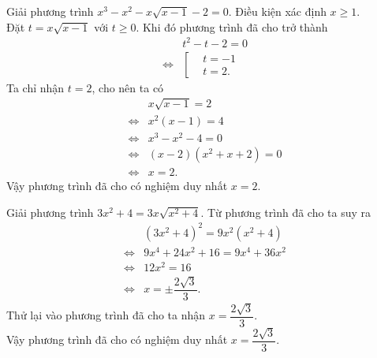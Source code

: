 \begin{bt}%
	Giải phương trình $x^3 - x^2 - x \sqrt{x - 1} - 2 = 0$.
	\loigiai
	{
		Điều kiện xác định $x \geq 1$.\\
		Đặt $t = x \sqrt{x - 1}$ với $t \geq 0$. Khi đó phương trình đã cho trở thành
		\begin{align*}
		& t^2 - t - 2 = 0 \\
		\Leftrightarrow & \left[\begin{aligned}& t = -1 \\& t = 2.  \end{aligned}\right.
		\end{align*}
		Ta chỉ nhận $t = 2$, cho nên ta có
		\begin{align*}
		& x\sqrt{x - 1} = 2 \\
		\Leftrightarrow & x^2(x-1)=4 \\
		\Leftrightarrow & x^3 - x^2 - 4 = 0 \\
		\Leftrightarrow & (x-2)(x^2+x+2)= 0 \\
		\Leftrightarrow & x=2.
		\end{align*}
		Vậy phương trình đã cho có nghiệm duy nhất $x = 2$.
	}
\end{bt}


\begin{bt}%
	Giải phương trình $3x^2 + 4 = 3x \sqrt{x^2 + 4}$.
	\loigiai
	{
		Từ phương trình đã cho ta suy ra
		\begin{align*}
		& (3x^2+4)^2 = 9x^2(x^2+4) \\
		\Leftrightarrow & 9x^4+24x^2+16 = 9x^4+36x^2 \\
		\Leftrightarrow & 12x^2 = 16 \\
		\Leftrightarrow & x = \pm\dfrac{2\sqrt{3}}{3}.
		\end{align*}
		Thử lại vào phương trình đã cho ta nhận $x = \dfrac{2\sqrt{3}}{3}$.\\
		Vậy phương trình đã cho có nghiệm duy nhất $x = \dfrac{2\sqrt{3}}{3}$.
	}
\end{bt}


